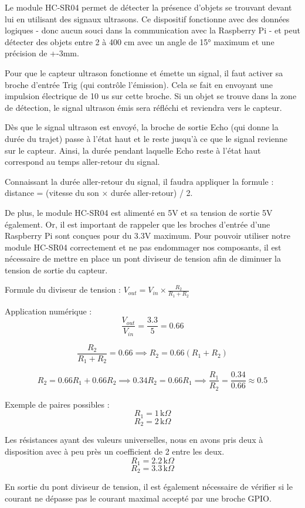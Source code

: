 \documentclass[a4paper,12pt]{report}  %
\begin{document}
Le module HC-SR04 permet de détecter la présence d’objets se trouvant devant lui en utilisant des signaux ultrasons. Ce dispositif fonctionne avec des données logiques - donc aucun souci dans la communication avec la Raspberry Pi - et peut détecter des objets entre 2 à 400 cm avec un angle de 15° maximum et une précision de +-3mm. 

Pour que le capteur ultrason fonctionne et émette un signal, il faut activer sa broche d’entrée Trig (qui contrôle l’émission). Cela se fait en envoyant une impulsion électrique de 10 us sur cette broche. Si un objet se trouve dans la zone de détection, le signal ultrason émis sera réfléchi et reviendra vers le capteur.

Dès que le signal ultrason est envoyé, la broche de sortie Echo (qui donne la durée du trajet) passe à l’état haut et le reste jusqu’à ce que le signal revienne sur le capteur. Ainsi, la durée pendant laquelle Echo reste à l’état haut correspond au temps aller-retour du signal.

Connaissant la durée aller-retour du signal, il faudra appliquer la formule : distance = (vitesse du son × durée aller-retour) / 2.

De plus, le module HC-SR04 est alimenté en 5V et sa tension de sortie 5V également. Or, il est important de rappeler que les broches d’entrée d’une Raspberry Pi sont conçues pour du 3.3V maximum. Pour pouvoir utiliser notre module HC-SR04 correctement et ne pas endommager nos composants, il est nécessaire de mettre en place un pont diviseur de tension afin de diminuer la tension de sortie du capteur.

Formule du diviseur de tension : $V_{out} = V_{in} \times \frac{R_2}{R_1 + R_2}$

Application numérique : $$\frac{V_{out}}{V_{in}} = \frac{3.3}{5} = 0.66$$

$$\frac{R_2}{R_1 + R_2} = 0.66 \implies R_2 = 0.66 (R_1 + R_2)$$

$$R_2 = 0.66 R_1 + 0.66 R_2 \implies 0.34 R_2 = 0.66 R_1 \implies \frac{R_1}{R_2} = \frac{0.34}{0.66} \approx 0.5$$


Exemple de paires possibles : 
$$R_1 = 1 \, \mathrm{k}\Omega$$
$$R_2 = 2 \, \mathrm{k}\Omega$$

Les résistances ayant des valeurs universelles, 
nous en avons pris deux à disposition avec à peu près un coefficient de 2 entre les deux.
$$R_1 = 2.2 \, \mathrm{k}\Omega$$
$$R_2 = 3.3 \, \mathrm{k}\Omega$$

En sortie du pont diviseur de tension, il est également nécessaire de vérifier si le courant ne dépasse pas le courant maximal accepté par une broche GPIO. 
\end{document}
